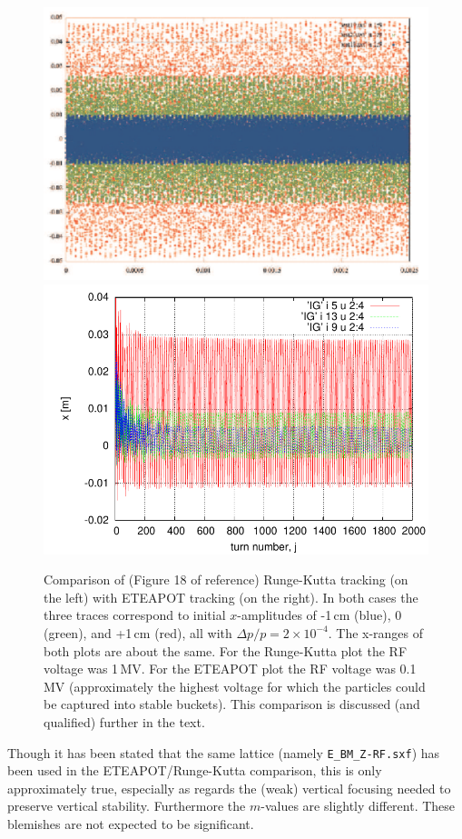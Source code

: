 \documentclass[12]{article}
\begin{document}
\begin{figure}[h]
\centering
\includegraphics[scale=0.35]{Yannis-RungeKutta.pdf}
\includegraphics[scale=0.6]{CheckYKS-Fig18.pdf}
\caption{\label{fig:YKS-ETEAPOT-compare}Comparison of
(Figure 18 of reference\cite{YKS-tracking}) 
Runge-Kutta tracking (on the left) with ETEAPOT tracking
(on the right). In both cases the three traces correspond
to initial $x$-amplitudes of -1\,cm (blue), 0 (green), and 
+1\,cm (red), all with $\Delta p/p=2\times10^{-4}$. The x-ranges 
of both plots are about the same. For the Runge-Kutta plot
the RF voltage was 1\,MV. For the
ETEAPOT plot the RF voltage was 0.1\,MV
(approximately the highest voltage for which the
particles could be captured into stable buckets). This
comparison is discussed (and qualified) further in the text.
}
\end{figure}
Though it has been stated that the same lattice (namely {\tt E\_BM\_Z-RF.sxf})
has been used in the ETEAPOT/Runge-Kutta comparison, this is only approximately
true, especially as regards the (weak) vertical focusing needed to preserve
vertical stability. Furthermore the $m$-values are slightly different.
These blemishes are not expected to be significant.
\end{document}
